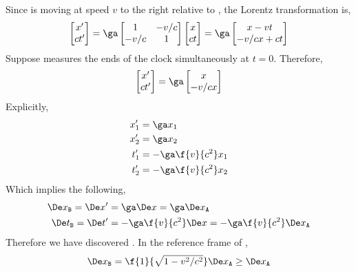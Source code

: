 \documentclass{article}
\begin{document}
Since  is moving at speed $v$ to the right relative to , the Lorentz transformation is,
\[ \sqm{x' \\ ct'} = \ga\sqm{1 & -v / c \\ -v /c & 1} \sqm{x \\ ct} = \ga \sqm{x - v t \\ -v /c x + c t} \]
Suppose  measures the ends of the clock simultaneously at $t = 0$. Therefore,
\[ \sqm{x' \\ ct'} = \ga \sqm{x \\- v /c x}  \]
Explicitly,
\begin{align*}
x'_1 &= \ga x_1 \\
x'_2 &= \ga x_2 \\
t'_1 &= -\ga \f{v}{c^2} x_1 \\
t'_2 &= -\ga \f{v}{c^2} x_2
\end{align*}
Which implies the following,
\begin{align*}
\De x_{\p{B}} = \De x' &= \ga \De x = \ga \De x_{\p{A}} \\
\De t_{\p{B}} = \De t' &= -\ga \f{v}{c^2} \De x = -\ga \f{v}{c^2} \De x_{\p{A}}
\end{align*}
Therefore we have discovered . In the reference frame of ,
\[ \De x_{\p{B}} = \f{1}{\sqrt{1 - v^2 /c^2}} \De x_{\p{A}} \geq \De x_{\p{A}}\]

\newcommand{\qqx}[2]{
\spacetimeneg{5}{5}{#1}{#2}{
    \draw[dashed, gray] (-\maxx, \maxt) -- (\maxx, - \maxt);

    \pgfmathsetmacro{\dtx}{1/5};
    \pgfmathsetmacro{\ray}{5};

    \coordinate (E) at ($\dtx*(x)$);
    \coordinate (E2) at ($2*\dtx*(x)$);
    \coordinate (Eray) at ($(E) + (\ray, \ray)$);
    \coordinate (Eray2) at ($(E2) + (\ray, \ray)$);
    \coordinate (EonB) at (intersection of n_x_p--x_p and E--Eray);
    \coordinate (EonB2) at (intersection of n_x_p--x_p and E2--Eray2);
    \draw[red, |-|] (E) node[below]{$x_1$} --  (E2) node[below]{$x_2$};

    \draw[lightcolor, ->] (E) -- (EonB);
    \draw[lightcolor, ->] (E2) -- (EonB2);

    \coordinate (EponBx) at ($(E) - (t_p)$);
    \coordinate (EonBx) at (intersection of n_x_p--x_p and E--EponBx);
    \draw[dashed, thin, blue] (E) -- (EonBx) ;
    \coordinate (EponBx2) at ($(E2) - (t_p)$);
    \coordinate (EonBx2) at (intersection of n_x_p--x_p and E2--EponBx2);
    \draw[dashed, thin, blue] (E2) -- (EonBx2) ;
    \draw[blue, |-|] (EonBx) node[above]{$x'_1$} -- (EonBx2) node[above]{$x'_2$};

    \coordinate (EponBt) at ($(E) + (x_p)$);
    \coordinate (EonBt) at (intersection of n_t_p--t_p and E--EponBt);
    \draw[dashed, thin, blue] (E) -- (EonBt) ;
    \coordinate (EponBt2) at ($(E2) + (x_p)$);
    \coordinate (EonBt2) at (intersection of n_t_p--t_p and E2--EponBt2);
    \draw[dashed, thin, blue] (E2) -- (EonBt2) ;
    \draw[blue, |-|] (EonBt) node[left]{$t'_1$} -- (EonBt2) node[left]{$t'_2$};

    \draw[fill] (E) circle[radius=0.05];
    \draw[fill] (E2) circle[radius=0.05];
}
}
\end{document}
